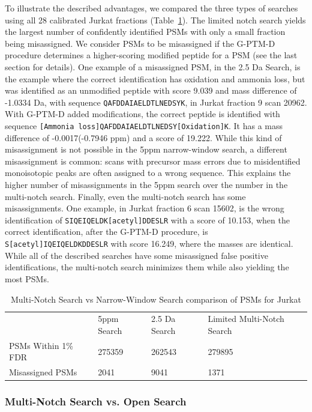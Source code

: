 \documentclass[journal=jprobs,manuscript=article]{achemso}
\begin{document}
To illustrate the described advantages, we compared the three types of searches using all 28 calibrated Jurkat fractions (Table~\ref{tbl:singleVsMultiNotch}).
The limited notch search yields the largest number of confidently identified PSMs with only a small fraction being misassigned.
We consider PSMs to be misassigned if the G-PTM-D procedure determines a higher-scoring modified peptide for a PSM (see the last section for details).
One example of a misassigned PSM, in the 2.5 Da Search, is the example where the correct identification has oxidation and ammonia loss, but was identified as an unmodified peptide with score 9.039 and mass difference of -1.0334 Da, with sequence \texttt{QAFDDAIAELDTLNEDSYK}, in Jurkat fraction 9 scan 20962.
With G-PTM-D added modifications, the correct peptide is identified with sequence \texttt{[Ammonia loss]QAFDDAIAELDTLNEDSY[Oxidation]K}.
It has a mass difference of -0.0017(-0.7946 ppm) and a score of 19.222.
While this kind of misassignment is not possible in the 5ppm narrow-window search, a different misassignment is common: scans with precursor mass errors due to misidentified monoisotopic peaks are often assigned to a wrong sequence.
This explains the higher number of misassignments in the 5ppm search over the number in the multi-notch search.
Finally, even the multi-notch search has some misassignments.
One example, in Jurkat fraction 6 scan 15602, is the wrong identification of \texttt{SIQEIQELDK[acetyl]DDESLR} with a score of 10.153, when the correct identification, after the G-PTM-D procedure, is \texttt{S[acetyl]IQEIQELDKDDESLR} with score 16.249, where the masses are identical.
While all of the described searches have some misassigned false positive identifications, the multi-notch search minimizes them while also yielding the most PSMs.

\begin{table}[]
\centering
\caption{Multi-Notch Search vs Narrow-Window Search comparison of PSMs for Jurkat}
\label{tbl:singleVsMultiNotch}
\begin{tabular}{llll}
                    & 5ppm Search & 2.5 Da Search & Limited Multi-Notch Search \\
PSMs Within 1\% FDR & 275359      & 262543        & 279895       \\
Misassigned PSMs    & 2041           & 9041          & 1371            \\
\end{tabular}
\end{table}

\subsubsection{Multi-Notch Search vs. Open Search}
\end{document}
